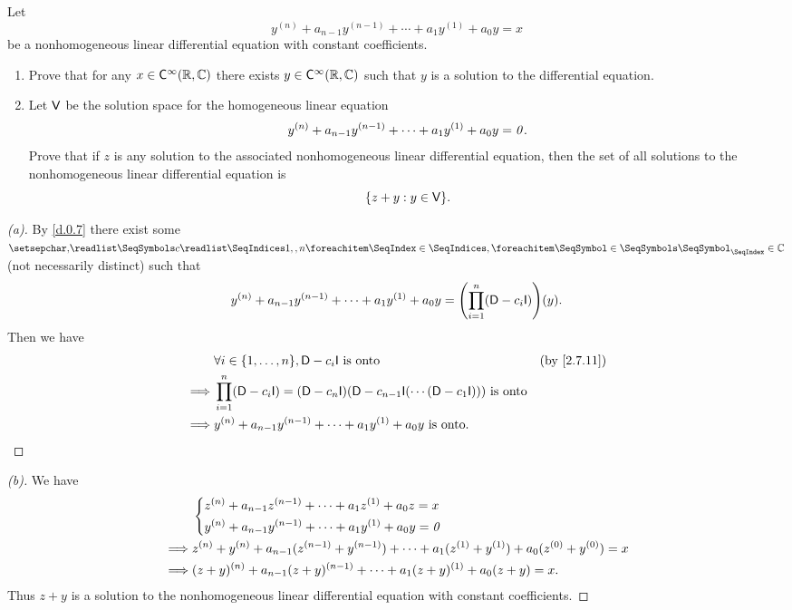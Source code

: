 \begin{ex}\label{ex:2.7.13}
	Let
	\[
		y^{(n)} + a_{n - 1} y^{(n - 1)} + \cdots + a_1 y^{(1)} + a_0 y = x
	\]
	be a nonhomogeneous linear differential equation with constant coefficients.
	\begin{enumerate}
		\item Prove that for any \(x \in \cfs[\infty](\R, \C)\) there exists \(y \in \cfs[\infty](\R, \C)\) such that \(y\) is a solution to the differential equation.
		\item Let \(\mathsf{V}\) be the solution space for the homogeneous linear equation
		      \[
			      y^{(n)} + a_{n - 1} y^{(n - 1)} + \cdots + a_1 y^{(1)} + a_0 y = \mathit{0}.
		      \]
		      Prove that if \(z\) is any solution to the associated nonhomogeneous linear differential equation, then the set of all solutions to the nonhomogeneous linear differential equation is
		      \[
			      \set{z + y : y \in \V}.
		      \]
	\end{enumerate}
\end{ex}

\begin{proof}[(a)]
	By \cref{d.0.7} there exist some \(\seq{c}{1,,n} \in \C\) (not necessarily distinct) such that
	\[
		y^{(n)} + a_{n - 1} y^{(n - 1)} + \cdots + a_1 y^{(1)} + a_0 y = \pa{\prod_{i = 1}^n (\Dop - c_i \IT)}(y).
	\]
	Then we have
	\begin{align*}
		         & \forall i \in \set{1, \dots, n}, \Dop - c_i \IT \text{ is onto}                                                     &  & \by{2.7.11} \\
		\implies & \prod_{i = 1}^n (\Dop - c_i \IT) = (\Dop - c_n \IT)(\Dop - c_{n - 1} \IT( \cdots (\Dop - c_1 \IT))) \text{ is onto}                  \\
		\implies & y^{(n)} + a_{n - 1} y^{(n - 1)} + \cdots + a_1 y^{(1)} + a_0 y \text{ is onto}.
	\end{align*}
\end{proof}

\begin{proof}[(b)]
	We have
	\begin{align*}
		         & \begin{dcases}
			           z^{(n)} + a_{n - 1} z^{(n - 1)} + \cdots + a_1 z^{(1)} + a_0 z = x \\
			           y^{(n)} + a_{n - 1} y^{(n - 1)} + \cdots + a_1 y^{(1)} + a_0 y = \mathit{0}
		           \end{dcases}                                                        \\
		\implies & z^{(n)} + y^{(n)} + a_{n - 1} (z^{(n - 1)} + y^{(n - 1)}) + \cdots + a_1 (z^{(1)} + y^{(1)}) + a_0 (z^{(0)} + y^{(0)}) = x \\
		\implies & (z + y)^{(n)} + a_{n - 1} (z + y)^{(n - 1)} + \cdots + a_1 (z + y)^{(1)} + a_0 (z + y) = x.
	\end{align*}
	Thus \(z + y\) is a solution to the nonhomogeneous linear differential equation with constant coefficients.
\end{proof}

